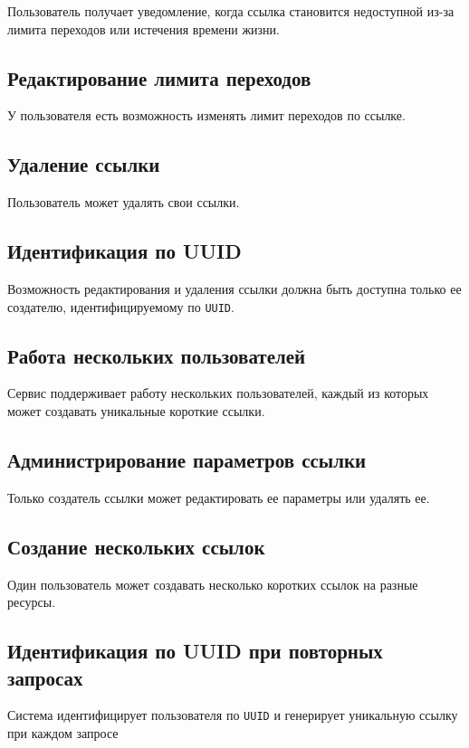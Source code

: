 \documentclass[a4paper, 14pt]{article}
\begin{document}
Пользователь получает уведомление, когда ссылка становится недоступной из-за лимита переходов или истечения времени жизни.

\subsection{Редактирование лимита переходов}

У пользователя есть возможность изменять лимит переходов по ссылке.

\subsection{Удаление ссылки}

Пользователь может удалять свои ссылки.

\subsection{Идентификация по UUID}

Возможность редактирования и удаления ссылки должна быть доступна только ее создателю, идентифицируемому по \texttt{UUID}.

\subsection{Работа нескольких пользователей}

Сервис поддерживает работу нескольких пользователей, каждый из которых может создавать уникальные короткие ссылки.

\subsection{Администрирование параметров ссылки}

Только создатель ссылки может редактировать ее параметры или удалять ее.

\subsection{Создание нескольких ссылок}

Один пользователь может создавать несколько коротких ссылок на разные ресурсы.

\subsection{Идентификация по UUID при повторных запросах}

Система идентифицирует пользователя по \texttt{UUID} и генерирует уникальную ссылку при каждом запросе
\end{document}
